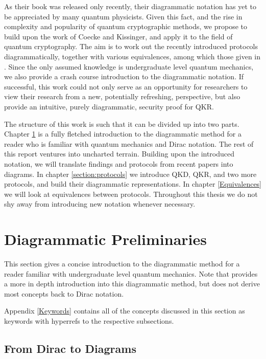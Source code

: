 \documentclass[]{article}
\begin{document}
As their book was released only recently, their diagrammatic notation has yet to be appreciated by many quantum physicists. Given this fact, and the rise in complexity and popularity of quantum cryptographic methods, we propose to build upon the work of Coecke and Kissinger, and apply it to the field of quantum cryptography. The aim is to work out the recently introduced protocols diagrammatically, together with various equivalences, among which those given in \cite{cryptoeprint:2019:875}. Since the only assumed knowledge is undergraduate level quantum mechanics, we also provide a crash course introduction to the diagrammatic notation. If successful, this work could not only serve as an opportunity for researchers to view their research from a new, potentially refreshing, perspective, but also provide an intuitive, purely diagrammatic, security proof for QKR.

The structure of this work is such that it can be divided up into two parts. Chapter \ref{section:preliminaries} is a fully fletched introduction to the diagrammatic method for a reader who is familiar with quantum mechanics and Dirac notation. The rest of this report ventures into uncharted terrain. Building upon the introduced notation, we will translate findings and protocols from recent papers into diagrams. In chapter \ref{section:protocols} we introduce QKD, QKR, and two more protocols, and build their diagrammatic representations. In chapter \ref{Equivalences} we will look at equivalences between protocols. Throughout this thesis we do not shy away from introducing new notation whenever necessary.
 
\section{Diagrammatic Preliminaries}
\label{section:preliminaries}

This section gives a concise introduction to the diagrammatic method for a reader familiar with undergraduate level quantum mechanics. Note that \cite{Coecke2017} provides a more in depth introduction into this diagrammatic method, but does not derive most concepts back to Dirac notation. 

Appendix \ref{Keywords} contains all of the concepts discussed in this section as keywords with hyperrefs to the respective subsections.

\subsection{From Dirac to Diagrams}
\end{document}
